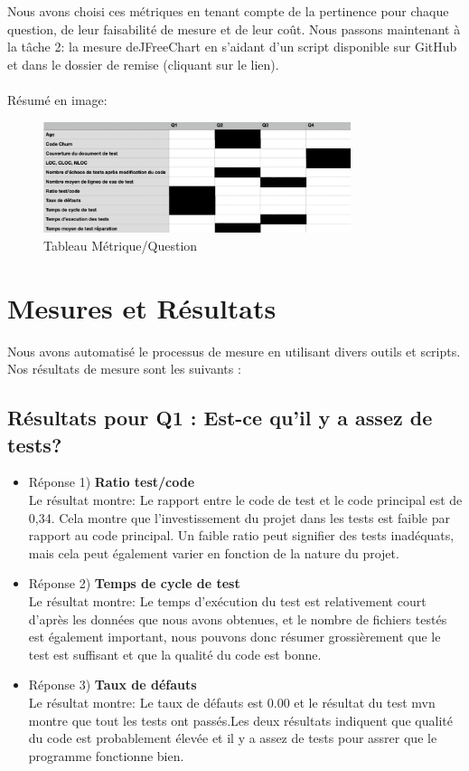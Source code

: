 \documentclass{proc}
\begin{document}
Nous avons choisi ces métriques en tenant compte de la pertinence pour chaque question, de leur faisabilité de mesure et de leur coût. Nous passons maintenant à la tâche 2: la mesure deJFreeChart en s'aidant d'un script disponible sur GitHub et dans le dossier de remise (cliquant sur le lien).
\\
\\
Résumé en image:\\
\begin{figure}[htp]
\includegraphics[width=9cm]{metrique.png}
\caption{Tableau Métrique/Question }
\end{figure}
\section{Mesures et Résultats}
Nous avons automatisé le processus de mesure en utilisant divers outils et scripts. Nos résultats de mesure sont les suivants :

\subsection{Résultats pour Q1 : Est-ce qu'il y a assez de tests?}
\begin{itemize}
    \item Réponse 1)\textbf{ Ratio test/code}
    \\Le résultat montre: Le rapport entre le code de test et le code principal est de 0,34. Cela montre que l'investissement du projet dans les tests est faible par rapport au code principal. Un faible ratio peut signifier des tests inadéquats, mais cela peut également varier en fonction de la nature du projet.
    \item Réponse 2)\textbf{ Temps de cycle de test}
    \\Le résultat montre: Le temps d'exécution du test est relativement court d'après les données que nous avons obtenues, et le nombre de fichiers testés est également important, nous pouvons donc résumer grossièrement que le test est suffisant et que la qualité du code est bonne.
    \item Réponse 3)\textbf{ Taux de défauts}
    \\Le résultat montre: Le taux de défauts est 0.00 et le résultat du test mvn montre que tout les tests ont passés.Les deux résultats indiquent  que qualité du code est probablement élevée et il y a assez de tests pour assrer que le programme fonctionne bien.
\end{itemize}
\end{document}
